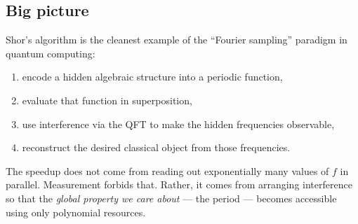\subsection{Big picture}

Shor's algorithm is the cleanest example of the ``Fourier sampling'' paradigm in quantum computing:
\begin{enumerate}
    \item encode a hidden algebraic structure into a periodic function,
    \item evaluate that function in superposition,
    \item use interference via the QFT to make the hidden frequencies observable,
    \item reconstruct the desired classical object from those frequencies.
\end{enumerate}
The speedup does not come from reading out exponentially many values of $f$ in parallel. Measurement forbids that. Rather, it comes from arranging interference so that the \emph{global property we care about} --- the period --- becomes accessible using only polynomial resources.















% 
% 
% 
